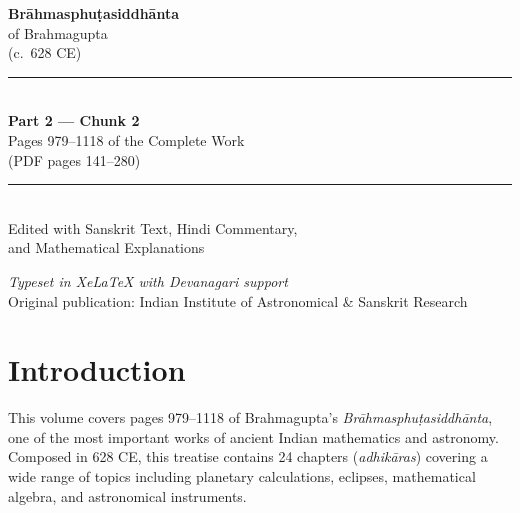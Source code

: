 \documentclass[11pt,a4paper]{article}
\newcommand{\shortline}{\noindent\rule{0.5\textwidth}{0.4pt}\par}
\begin{document}
\begin{titlepage}
\begin{center}
\vspace*{3cm}

{\Huge\bfseries\color{titlecolor} Brāhmasphuṭasiddhānta}\\[0.8cm]
{\LARGE\color{sectioncolor} of Brahmagupta}\\[0.3cm]
{\large (c.\ 628 CE)}\\[2cm]

\shortline\\[0.5cm]
{\Large\bfseries Part 2 — Chunk 2}\\[0.3cm]
{\large Pages 979–1118 of the Complete Work}\\[0.3cm]
{\normalsize (PDF pages 141–280)}\\[1cm]
\shortline\\[1.5cm]

{\large Edited with Sanskrit Text, Hindi Commentary,\\
and Mathematical Explanations}\\[2cm]

\vfill

{\small\textit{Typeset in XeLaTeX with Devanagari support}}\\[0.3cm]
{\small Original publication: Indian Institute of Astronomical \& Sanskrit Research}

\end{center}
\end{titlepage}

\tableofcontents
\newpage

\section*{Introduction}

This volume covers pages 979–1118 of Brahmagupta's \textit{Brāhmasphuṭasiddhānta}, one of the most important works of ancient Indian mathematics and astronomy. Composed in 628 CE, this treatise contains 24 chapters (\textit{adhikāras}) covering a wide range of topics including planetary calculations, eclipses, mathematical algebra, and astronomical instruments.
\end{document}
